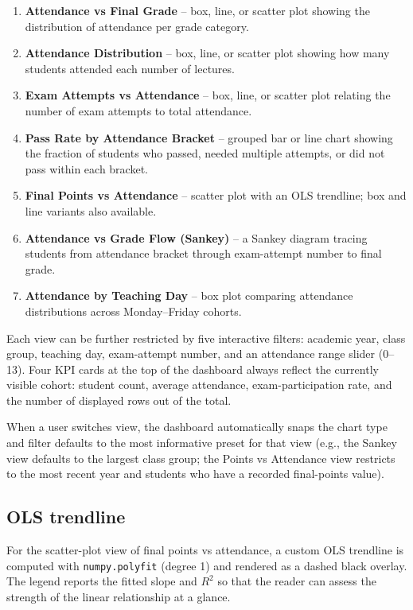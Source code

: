 \documentclass[final,3p,times,twocolumn]{elsarticle}
\begin{document}
\begin{enumerate}
  \item \textbf{Attendance vs Final Grade} -- box, line, or scatter
        plot showing the distribution of attendance per grade category.
  \item \textbf{Attendance Distribution} -- box, line, or scatter plot
        showing how many students attended each number of lectures.
  \item \textbf{Exam Attempts vs Attendance} -- box, line, or scatter
        plot relating the number of exam attempts to total attendance.
  \item \textbf{Pass Rate by Attendance Bracket} -- grouped bar or line
        chart showing the fraction of students who passed, needed
        multiple attempts, or did not pass within each bracket.
  \item \textbf{Final Points vs Attendance} -- scatter plot with an
        OLS trendline; box and line variants also available.
  \item \textbf{Attendance vs Grade Flow (Sankey)} -- a Sankey diagram
        tracing students from attendance bracket through exam-attempt
        number to final grade.
  \item \textbf{Attendance by Teaching Day} -- box plot comparing
        attendance distributions across Monday--Friday cohorts.
\end{enumerate}

Each view can be further restricted by five interactive filters:
academic year, class group, teaching day, exam-attempt number, and
an attendance range slider (0--13).
Four KPI cards at the top of the dashboard always reflect the
currently visible cohort: student count, average attendance,
exam-participation rate, and the number of displayed rows out of
the total.

When a user switches view, the dashboard automatically snaps the
chart type and filter defaults to the most informative preset for
that view (e.g., the Sankey view defaults to the largest class group;
the Points vs Attendance view restricts to the most recent year and
students who have a recorded final-points value).

\subsection{OLS trendline}

For the scatter-plot view of final points vs attendance, a
custom OLS trendline is computed with \texttt{numpy.polyfit}
(degree 1) and rendered as a dashed black overlay.
The legend reports the fitted slope and $R^2$ so that the reader
can assess the strength of the linear relationship at a glance.
\end{document}
